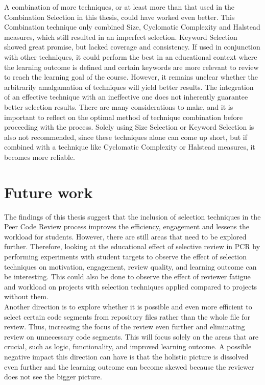 A combination of more techniques, or at least more than that used in the Combination Selection in this thesis, could have worked even better. This Combination technique only combined Size, Cyclomatic Complexity and Halstead measures, which still resulted in an imperfect selection. Keyword Selection showed great promise, but lacked coverage and consistency. If used in conjunction with other techniques, it could perform the best in an educational context where the learning outcome is defined and certain keywords are more relevant to review to reach the learning goal of the course. However, it remains unclear whether the arbitrarily amalgamation of techniques will yield better results. The integration of an effective technique with an ineffective one does not inherently guarantee better selection results. There are many considerations to make, and it is important to reflect on the optimal method of technique combination before proceeding with the process. Solely using Size Selection or Keyword Selection is also not recommended, since these techniques alone can come up short, but if combined with a technique like Cyclomatic Complexity or Halstead measures, it becomes more reliable. \\




\section{Future work}
The findings of this thesis suggest that the inclusion of selection techniques in the Peer Code Review process improves the efficiency, engagement and lessens the workload for students. However, there are still areas that need to be explored further. Therefore, looking at the educational effect of selective review in PCR by performing experiments with student targets to observe the effect of selection techniques on motivation, engagement, review quality, and learning outcome can be interesting. This could also be done to observe the effect of reviewer fatigue and workload on projects with selection techniques applied compared to projects without them. \\

Another direction is to explore whether it is possible and even more efficient to select certain code segments from repository files rather than the whole file for review. Thus, increasing the focus of the review even further and eliminating review on unnecessary code segments. This will focus solely on the areas that are crucial, such as logic, functionality, and improved learning outcome. A possible negative impact this direction can have is that the holistic picture is dissolved even further and the learning outcome can become skewed because the reviewer does not see the bigger picture. \\

